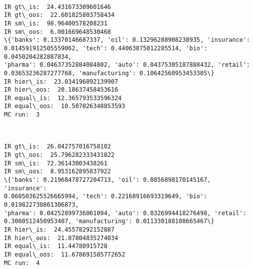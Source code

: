 \documentclass[11pt]{article}
\begin{document}
    \begin{center}
    \end{center}
    { \hspace*{\fill} \\}
    
    \begin{Verbatim}[commandchars=\\\{\},fontsize=\footnotesize]
IR gt\_is:  24.431673309601646
IR gt\_oos:  22.601825803758434
IR sm\_is:  98.96400578208231
IR sm\_oos:  6.001669648530468
\{'banks': 0.13370146687337, 'oil': 0.13296288908238935, 'insurance':
0.014591912505559062, 'tech': 0.44063875012285514, 'bio': 0.0450204282887834,
'pharma': 0.04637352884084802, 'auto': 0.04375305187888432, 'retail':
0.03653236287277768, 'manufacturing': 0.10642560953453305\}
IR hier\_is:  23.034196892139907
IR hier\_oos:  20.18637458453616
IR equal\_is:  12.365793533596324
IR equal\_oos:  10.507026348853593
MC run:  3

    \end{Verbatim}

    \begin{center}
    \end{center}
    { \hspace*{\fill} \\}
    
    \begin{Verbatim}[commandchars=\\\{\},fontsize=\footnotesize]
IR gt\_is:  26.042757016758102
IR gt\_oos:  25.796282333431822
IR sm\_is:  72.36143003438261
IR sm\_oos:  8.953162895837922
\{'banks': 0.21968478727204713, 'oil': 0.0856898170145167, 'insurance':
0.060503625526665994, 'tech': 0.22168916693319649, 'bio': 0.019822730861306873,
'pharma': 0.04252899736061094, 'auto': 0.0326994418276498, 'retail':
0.3060512450953407, 'manufacturing': 0.011330188108665467\}
IR hier\_is:  24.45578292152887
IR hier\_oos:  21.87804835274034
IR equal\_is:  11.44780915728
IR equal\_oos:  11.678691585772652
MC run:  4

    \end{Verbatim}

    \begin{center}
    \end{center}
    { \hspace*{\fill} \\}
    
\end{document}
